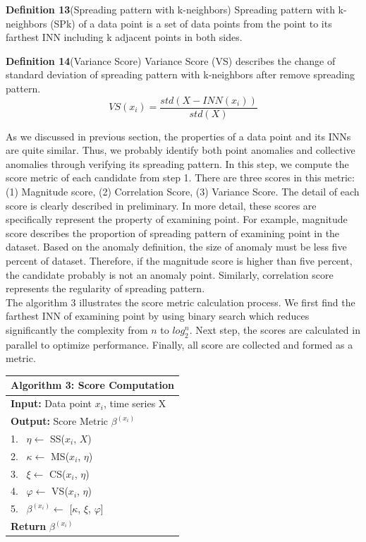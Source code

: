 \par \textbf{Definition 13}(Spreading pattern with k-neighbors) Spreading pattern with k-neighbors (SPk) of a data point is a set of data points from the point to its farthest INN including k adjacent points in both sides.\\

\par \textbf{Definition 14}(Variance Score) Variance Score (VS) describes the change of standard deviation of spreading pattern with k-neighbors after remove spreading pattern.
\begin{equation}\label{Variance Score}
VS(x_i) = \frac{std(X - INN(x_i))}{std(X)}
\end{equation}

As we discussed in previous section, the properties of a data point and its INNs are quite similar. Thus, we probably identify both point anomalies and collective anomalies through verifying its spreading pattern.
In this step, we compute the score metric of each candidate from step 1. There are three scores in this metric: (1) Magnitude score, (2) Correlation Score, (3) Variance Score. The detail of each score is clearly described in preliminary. In more detail, these scores are specifically represent the property of examining point. For example, magnitude score describes the proportion of spreading pattern of examining point in the dataset. Based on the anomaly definition, the size of anomaly  must be less five percent of dataset. Therefore, if the magnitude score is higher than five percent, the candidate probably is not an anomaly point. Similarly, correlation score represents the regularity of spreading pattern. \\

The algorithm 3 illustrates the score metric calculation process. We first find the farthest INN of examining point by using binary search which reduces significantly the complexity from $ n $ to $ log_2^n $. Next step, the scores are calculated in parallel to optimize performance. Finally, all score are collected and formed as a metric. 
\begin{table}[h]
	\centering
	\label{al-2}
	\begin{tabular}{l}
		\toprule
		\textbf{Algorithm 3:} Score Computation\\
		\midrule
		\textbf{Input: } Data point $ x_i $, time series X \\
		\textbf{Output:} Score Metric $ \beta^{(x_i)} $\\
		1.~ $ \eta \leftarrow $  SS($ x_i $, $ X $) \\
		2.~ $ \kappa \leftarrow $  MS($ x_i $, $ \eta $) \\
		3.~ $ \xi \leftarrow $  CS($ x_i $, $ \eta $) \\
		4.~ $ \varphi \leftarrow $  VS($ x_i $, $ \eta $) \\
		5.~ $ \beta^{(x_i)} \leftarrow $ [$ \kappa $, $ \xi $, $ \varphi $]  \\
		\textbf{Return} $ \beta^{(x_i)} $
		
	\end{tabular}
\end{table}

